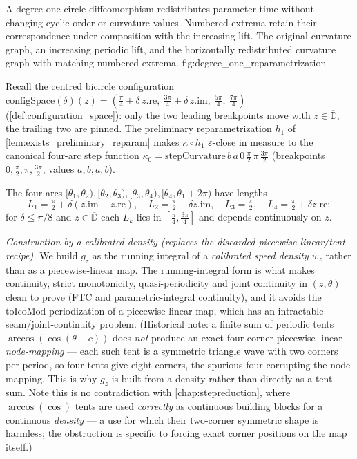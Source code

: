   {A degree-one circle diffeomorphism redistributes parameter time without
   changing cyclic order or curvature values. Numbered extrema retain their
   correspondence under composition with the increasing lift.}
  {The original curvature graph, an increasing periodic lift, and the
   horizontally redistributed curvature graph with matching numbered extrema.}
  {fig:degree_one_reparametrization}

Recall the centred bicircle configuration $\mathrm{configSpace}(\delta)(z) =
(\tfrac{\pi}{4}+\delta\,z.\mathrm{re},\ \tfrac{3\pi}{4}+\delta\,z.\mathrm{im},\
\tfrac{5\pi}{4},\ \tfrac{7\pi}{4})$ (\cref{def:configuration_space}): only the two
leading breakpoints move with $z\in\overline{\mathbb{D}}$, the trailing two are
pinned. The preliminary reparametrization $h_1$ of
\cref{lem:exists_preliminary_reparam} makes $\kappa\circ h_1$ $\varepsilon$-close
in measure to the canonical four-arc step function $\kappa_0 = \mathrm{stepCurvature}\,
b\,a\,0\,\tfrac{\pi}{2}\,\pi\,\tfrac{3\pi}{2}$ (breakpoints $0,\tfrac{\pi}{2},
\pi,\tfrac{3\pi}{2}$, values $a,b,a,b$).

The four arcs
$[\theta_1,\theta_2),[\theta_2,\theta_3),[\theta_3,\theta_4),[\theta_4,\theta_1+2\pi)$
have lengths
\[
  L_1=\tfrac{\pi}{2}+\delta(z.\mathrm{im}-z.\mathrm{re}),\quad
  L_2=\tfrac{\pi}{2}-\delta z.\mathrm{im},\quad
  L_3=\tfrac{\pi}{2},\quad
  L_4=\tfrac{\pi}{2}+\delta z.\mathrm{re};
\]
for $\delta\le\pi/8$ and $z\in\overline{\mathbb D}$ each $L_k$ lies in
$[\tfrac{\pi}{4},\tfrac{3\pi}{4}]$ and depends continuously on $z$.

\medskip

\noindent\emph{Construction by a calibrated density (replaces the discarded
piecewise-linear/tent recipe).} We build $g_z$ as the running integral of a
\emph{calibrated speed density} $w_z$ rather than as a piecewise-linear map. The
running-integral form is what makes continuity, strict monotonicity, quasi-period\-icity
and joint continuity in $(z,\theta)$ clean to prove (FTC and parametric-integral
continuity), and it avoids the $\mathrm{toIcoMod}$-periodization of a piecewise-linear
map, which has an intractable seam/joint-continuity problem. (Historical note: a
finite sum of periodic tents $\arccos(\cos(\theta-c))$ does \emph{not} produce an
exact four-corner piecewise-linear \emph{node-mapping} --- each such tent is a
symmetric triangle wave with two corners per period, so four tents give eight
corners, the spurious four corrupting the node mapping. This is why $g_z$ is built
from a density rather than directly as a tent-sum. Note this is no contradiction
with \cref{chap:stepreduction}, where $\arccos(\cos)$ tents are used \emph{correctly}
as continuous building blocks for a continuous \emph{density} --- a use for which
their two-corner symmetric shape is harmless; the obstruction is specific to forcing
exact corner positions on the map itself.)

